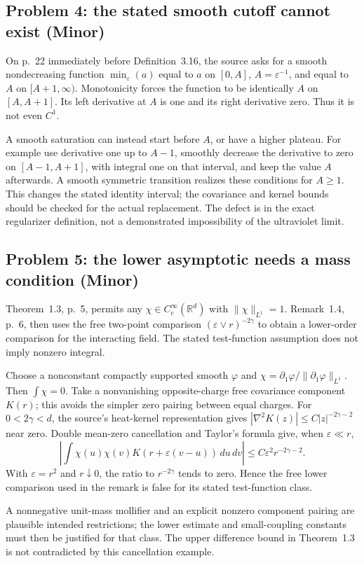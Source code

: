 \documentclass[10pt]{article}
\begin{document}
\subsection*{Problem 4: the stated smooth cutoff cannot exist (Minor)}
On p. 22 immediately before Definition 3.16, the source asks for a smooth nondecreasing function \(\min_\varepsilon(a)\) equal to \(a\) on \([0,A]\), \(A=\varepsilon^{-1}\), and equal to \(A\) on \([A+1,\infty)\). Monotonicity forces the function to be identically \(A\) on \([A,A+1]\). Its left derivative at \(A\) is one and its right derivative zero. Thus it is not even \(C^1\).\par
A smooth saturation can instead start before \(A\), or have a higher plateau. For example use derivative one up to \(A-1\), smoothly decrease the derivative to zero on \([A-1,A+1]\), with integral one on that interval, and keep the value \(A\) afterwards. A smooth symmetric transition realizes these conditions for \(A\geq1\). This changes the stated identity interval; the covariance and kernel bounds should be checked for the actual replacement. The defect is in the exact regularizer definition, not a demonstrated impossibility of the ultraviolet limit.\par
\subsection*{Problem 5: the lower asymptotic needs a mass condition (Minor)}
Theorem 1.3, p. 5, permits any \(\chi\in C_c^\infty(\mathbb R^d)\) with \(\|\chi\|_{L^1}=1\). Remark 1.4, p. 6, then uses the free two-point comparison \((\varepsilon\vee r)^{-2\gamma}\) to obtain a lower-order comparison for the interacting field. The stated test-function assumption does not imply nonzero integral.\par
Choose a nonconstant compactly supported smooth \(\varphi\) and \(\chi=\partial_1\varphi/\|\partial_1\varphi\|_{L^1}\). Then \(\int\chi=0\). Take a nonvanishing opposite-charge free covariance component \(K(r)\); this avoids the simpler zero pairing between equal charges. For \(0<2\gamma<d\), the source’s heat-kernel representation gives \(|\nabla^2K(z)|\leq C|z|^{-2\gamma-2}\) near zero. Double mean-zero cancellation and Taylor’s formula give, when \(\varepsilon\ll r\), \[\left|\int\chi(u)\chi(v)K(r+\varepsilon(v-u))\,du\,dv\right|
       \leq C\varepsilon^2 r^{-2\gamma-2}.\] With \(\varepsilon=r^2\) and \(r\downarrow0\), the ratio to \(r^{-2\gamma}\) tends to zero. Hence the free lower comparison used in the remark is false for its stated test-function class.\par
A nonnegative unit-mass mollifier and an explicit nonzero component pairing are plausible intended restrictions; the lower estimate and small-coupling constants must then be justified for that class. The upper difference bound in Theorem 1.3 is not contradicted by this cancellation example.\par
\end{document}
